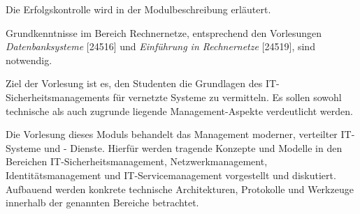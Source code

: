 \begin{course}

\setdoclanguagegerman
{}



\coursehead


\label{cour_5399.dp_997}


\begin{styleenv}
\begin{assessment}
Die Erfolgskontrolle wird in der Modulbeschreibung erläutert.


\end{assessment}

\begin{conditions}Grundkenntnisse im Bereich Rechnernetze, entsprechend den Vorlesungen \emph{Datenbanksysteme }[24516] und \emph{Einführung in Rechnernetze} [24519], sind notwendig.

\end{conditions}


\end{styleenv}

\begin{learningoutcomes}
Ziel der Vorlesung ist es, den Studenten die Grundlagen des IT-Sicherheitsmanagements für vernetzte Systeme zu vermitteln. Es sollen sowohl technische als auch zugrunde liegende Management-Aspekte verdeutlicht werden.


\end{learningoutcomes}

\begin{content}
Die Vorlesung dieses Moduls behandelt das Management moderner, verteilter IT-Systeme und - Dienste. Hierfür werden tragende Konzepte und Modelle in den Bereichen IT-Sicherheitsmanagement, Netzwerkmanagement, Identitätsmanagement und IT-Servicemanagement vorgestellt und diskutiert. Aufbauend werden konkrete technische Architekturen, Protokolle und Werkzeuge innerhalb der genannten Bereiche betrachtet.


\end{content}
\end{course}
